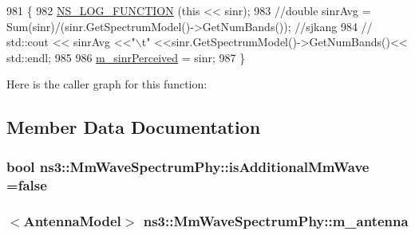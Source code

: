 \begin{DoxyCode}
981 \{
982         \hyperlink{log-macros-disabled_8h_a90b90d5bad1f39cb1b64923ea94c0761}{NS\_LOG\_FUNCTION} (\textcolor{keyword}{this} << sinr);
983          \textcolor{comment}{//double sinrAvg = Sum(sinr)/(sinr.GetSpectrumModel()->GetNumBands()); //sjkang}
984                 \textcolor{comment}{//              std::cout << sinrAvg <<"\(\backslash\)t" <<sinr.GetSpectrumModel()->GetNumBands()<<
       std::endl;}
985 
986         \hyperlink{classns3_1_1MmWaveSpectrumPhy_a61da15a483343ea141a555b3712db8d7}{m\_sinrPerceived} = sinr;
987 \}
\end{DoxyCode}


Here is the caller graph for this function\+:




\subsection{Member Data Documentation}
\subsubsection[{\texorpdfstring{is\+Additional\+Mm\+Wave}{isAdditionalMmWave}}]{\setlength{\rightskip}{0pt plus 5cm}bool ns3\+::\+Mm\+Wave\+Spectrum\+Phy\+::is\+Additional\+Mm\+Wave ={\bf false}}\hypertarget{classns3_1_1MmWaveSpectrumPhy_a424e1d78317df52f798d7dee04f4c096}{}\label{classns3_1_1MmWaveSpectrumPhy_a424e1d78317df52f798d7dee04f4c096}
\subsubsection[{\texorpdfstring{m\+\_\+antenna}{m_antenna}}]{$<${\bf Antenna\+Model}$>$ ns3\+::\+Mm\+Wave\+Spectrum\+Phy\+::m\+\_\+antenna\hspace{0.3cm}{\ttfamily [private]}}\hypertarget{classns3_1_1MmWaveSpectrumPhy_a1f6c5c95f983a34958e8a768ecd611a1}{}\label{classns3_1_1MmWaveSpectrumPhy_a1f6c5c95f983a34958e8a768ecd611a1}
